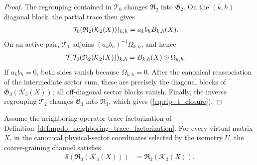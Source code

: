 \begin{proof}
    \leanok
    The regrouping contained in $\mathcal T_0$ changes
    $\mathfrak R_2$ into $\mathfrak G_2$. On the $(k,h)$ diagonal block, the
    partial trace then gives
    \begin{align}
        \mathcal T_0
        (\mathfrak R_2(\mathcal K_2(X)))_{k,h}
         & =a_kb_hB_{k,h}(X).
        \notag
    \end{align}
    On an active pair, $\mathcal T_1$ adjoins
    $(a_kb_h)^{-1}\Omega_{k,h}$, and hence
    \begin{align}
        \mathcal T_1\mathcal T_0
        (\mathfrak R_2(\mathcal K_2(X)))_{k,h}
         & =B_{k,h}(X)\otimes\Omega_{k,h}.
        \notag
    \end{align}
    If $a_kb_h=0$, both sides vanish because
    $\Omega_{k,h}=0$. After the canonical reassociation of the intermediate
    sector sum, these are precisely the diagonal blocks of
    $\mathfrak G_3(\mathcal K_3(X))$; all off-diagonal sector blocks vanish.
    Finally, the inverse regrouping $\mathcal T_2$ changes
    $\mathfrak G_3$ into $\mathfrak R_3$, which gives
    (\ref{eq:rfp_t_closure}).
\end{proof}

\begin{lemma}
    \label{thm:mpdo_physical_sector_s_closure_identity}
    \leanok
    Assume the neighboring-operator trace factorization of
    Definition~\ref{def:mpdo_neighboring_trace_factorization}. For every
    virtual matrix $X$, in the canonical physical-sector
    coordinates selected by the isometry $U$, the coarse-graining channel
    satisfies
    \begin{align}
        \mathcal S(\mathfrak R_3(\mathcal K_3(X)))
         & =\mathfrak R_2(\mathcal K_2(X)).
        \label{eq:rfp_s_closure}
    \end{align}
\end{lemma}

